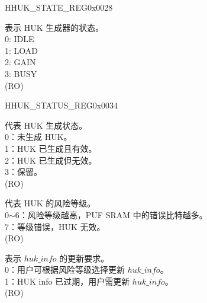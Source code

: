 \begin{register}{H}{HUK\_STATE\_REG}{0x0028}\label{regdesc:HUKSTATEREG}
%
%
\regnewline%
\begin{regdesc}\begin{reglist}
\label{fielddesc:HUKSTATE}\item [HUK\_STATE] 表示 HUK 生成器的状态。\\
0: IDLE \\
1: LOAD \\
2: GAIN\\
3: BUSY\\
(RO)
\end{reglist}\end{regdesc}
\end{register}


\begin{register}{H}{HUK\_STATUS\_REG}{0x0034}\label{regdesc:HUKSTATUSREG}
%
%
%
%
\regnewline%
\begin{regdesc}\begin{reglist}
\label{fielddesc:HUKSTATUS}\item [HUK\_STATUS] 代表 HUK 生成状态。\\
 0：未生成 HUK。\\
1：HUK 已生成且有效。\\
 2：HUK 已生成但无效。\\
3：保留。\\
(RO)
\label{fielddesc:HUKRISKLEVEL}\item [HUK\_RISK\_LEVEL] 代表 HUK 的风险等级。\\
 0$\sim$6：风险等级越高，PUF SRAM 中的错误比特越多。\\
7：等级错误，HUK 无效。\\
(RO)
\label{fielddesc:HUKUPDATEREQ}\item [HUK\_UPDATE\_REQ] 表示 \begin{math}huk\_info\end{math} 的更新要求。\\
0：用户可根据风险等级选择更新 \begin{math}huk\_info\end{math}。\\
1：HUK info 已过期，用户需更新 \begin{math}huk\_info\end{math}。\\
(RO)
\end{reglist}\end{regdesc}
\end{register}


